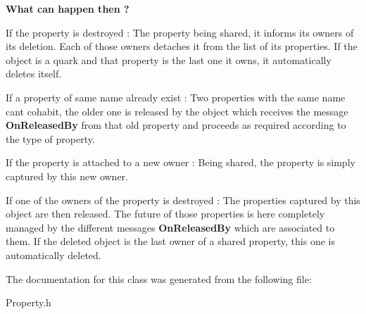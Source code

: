 {\bfseries What can happen then ?}

If the property is destroyed \+: The property being shared, it informs its owners of its deletion. Each of those owners detaches it from the list of its properties. If the object is a quark and that property is the last one it owns, it automatically deletes itself.

If a property of same name already exist \+: Two properties with the same name can\textquotesingle{}t cohabit, the older one is released by the object which receives the message {\bfseries On\+Released\+By} from that old property and proceeds as required according to the type of property.

If the property is attached to a new owner \+: Being shared, the property is simply captured by this new owner.

If one of the owners of the property is destroyed \+: The properties captured by this object are then released. The future of those properties is here completely managed by the different messages {\bfseries On\+Released\+By} which are associated to them. If the deleted object is the last owner of a shared property, this one is automatically deleted. 

The documentation for this class was generated from the following file\+:\begin{DoxyCompactItemize}
\item 
Property.\+h\end{DoxyCompactItemize}
